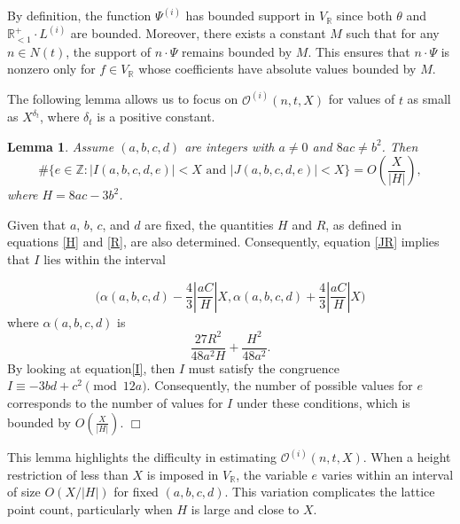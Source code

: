 \documentclass{article}
\newtheorem{lemma}[theorem]{Lemma}
\newenvironment{proof}{\noindent {\bf Proof:}}{$\Box$ \vspace{2 ex}}
\def \Bo{{\mathcal{O}^{(i)}(n,t,X)}}
\def\JR{\frac{27R^2}{48a^2H}+\frac{H^2}{48a^2}}
\begin{document}
By definition, the function $\Psi^{(i)}$ has bounded support in $V_{\mathbb{R}}$ since both $\theta$ and $\mathbb{R}^{+}_{<1} \cdot L^{(i)}$ are bounded. Moreover, there exists a constant $M$ such that for any $n \in N(t)$, the support of $n \cdot \Psi$ remains bounded by $M$. This ensures that $n \cdot \Psi$ is nonzero only for $f \in V_{\mathbb{R}}$ whose coefficients have absolute values bounded by $M$.





The following lemma allows us to focus on $\Bo$ for values of $t$ as small as $X^{\delta_t}$, where $\delta_t$ is a positive constant.

\begin{lemma}\label{eBound}
Assume $(a, b, c, d)$ are integers with $a \neq 0$ and $8ac \neq b^2$. Then
\begin{equation*}
\# \Big\{e \in \mathbb{Z} : |I(a, b, c, d, e)| < X \text{ and } |J(a, b, c, d, e)| < X\Big\} = O\left(\frac{X}{|H|}\right),
\end{equation*}
where $H = 8ac - 3b^2$.
\end{lemma}
\begin{proof}
Given that $a$, $b$, $c$, and $d$ are fixed, the quantities $H$ and $R$, as defined in equations \eqref{H} and \eqref{R}, are also determined. Consequently, equation \eqref{JR} implies that $I$ lies within the interval

\begin{equation*}
\Big(\alpha(a,b,c,d)-\frac{4}{3}\left|\frac{aC}{H}\right|X, \alpha(a,b,c,d)+\frac{4}{3}\left|\frac{aC}{H}\right|X\Big)
\end{equation*}
where $\alpha(a,b,c,d)$ is
\begin{equation*}
\JR.
\end{equation*}
By looking at equation\eqref{I}, then $I$ must satisfy the congruence $I \equiv -3bd + c^2 \pmod{12a}$. Consequently, the number of possible values for $e$ corresponds to the number of values for $I$ under these conditions, which is bounded by $O\left(\frac{X}{|H|}\right)$. 
\end{proof}

This lemma highlights the difficulty in estimating $\Bo$. When a height restriction of less than $X$ is imposed in $V_{\mathbb{R}}$, the variable $e$ varies within an interval of size $O(X/|H|)$ for fixed $(a, b, c, d)$. This variation complicates the lattice point count, particularly when $H$ is large and close to $X$.
\end{document}
